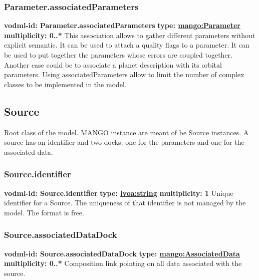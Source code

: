     \subsubsection{Parameter.associatedParameters}
      \textbf{vodml-id: Parameter.associatedParameters} \newline
      \textbf{type: \hyperref[sect:Parameter]{mango:Parameter}} \newline
      \textbf{multiplicity: 0..*} \newline 
      This association allows to gather different parameters without explicit semantic. It can be used to attach a quality flags to a parameter. It can be used to put together the parameters whose errors are coupled together. Another case could be to associate a planet description with its orbital parameters. Using associatedParameters allow to limit the number of complex classes to be implemented in the model.

  \subsection{Source}
  \label{sect:Source}
    Root class of the model. MANGO instance are meant of be Source instances. A source has an identifier and two docks: one for the parameters and one for the associated data.

    \subsubsection{Source.identifier}
      \textbf{vodml-id: Source.identifier} \newline
      \textbf{type: \hyperref[sect:ivoa]{ivoa:string}} \newline
      \textbf{multiplicity: 1} \newline 
      Unique identifier for a Source. The uniqueness of that identifier is not managed by the model. The format is free.

    \subsubsection{Source.associatedDataDock}
      \textbf{vodml-id: Source.associatedDataDock} \newline
      \textbf{type: \hyperref[sect:AssociatedData]{mango:AssociatedData}} \newline
      \textbf{multiplicity: 0..*} \newline 
      Composition link pointing on all data associated with the source.

